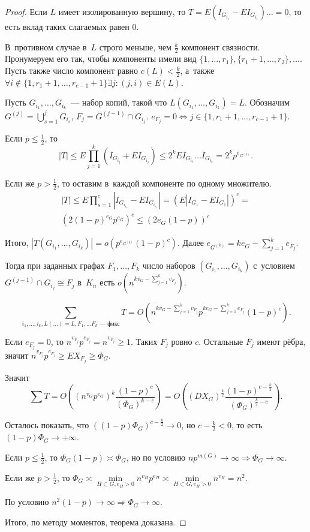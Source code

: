 \documentclass{article}
\begin{document}
\begin{proof}
	Если $L$ имеет изолированную вершину, то $T = E(I_{G_{i_1}} - EI_{G_{i_1}})
	\ldots = 0$, то есть вклад таких слагаемых равен 0.

	В~противном случае в~$L$ строго меньше, чем $\frac{k}{2}$ компонент связности.
	Пронумеруем его так, чтобы компоненты имели вид $\{1, \ldots, r_1\}, \{ r_1 +
	1, \ldots, r_2 \}, \ldots$. Пусть также число компонент равно $c(L) <
	\frac{k}{2}$, а~также $\forall i \notin \{1, r_1 + 1, \ldots, r_{c-1}+1\}
	\exists j: (j, i) \in E(L)$.

	Пусть $G_{i_1}, \ldots, G_{i_k}$~--- набор копий, такой что $L(G_{i_1},
	\ldots, G_{i_k}) = L$. Обозначим $G^{(j)} = \bigcup\limits_{s=1}^j G_{i_s}$,
	$F_j = G^{(j-1)} \cap G_{i_j}$. $e_{F_j} = 0 \Leftrightarrow j \in \{1, r_1 +
	1, \ldots, r_{c-1} + 1\}$.

	Если $p \le \frac{1}{2}$, то
	$$|T| \le E \prod\limits_{j=1}^k (I_{G_{i_j}} + EI_{G_{i_j}}) \le 2^k
	EI_{G_{i_1}} \ldots I_{G_{i_k}} = 2^k p^{e_{G^{(k)}}}.$$

	Если же $p > \frac{1}{2}$, то оставим в~каждой компоненте по одному множителю.
	\begin{multline*}
	|T| \le E \prod\limits_{s=1}^c |I_{G_{i_{r_s}}} - EI_{G_{i_{r_s}}}| =
	(E|I_{G_1} - EI_{G_1}|)^c =\\
		(2(1-p)^{e_G}p^{e_G})^c \le (2e_G(1-p))^c
	\end{multline*}

	Итого, $|T(G_{i_1}, \ldots, G_{i_k})| = o(p^{e_{G^{(k)}}} (1 - p)^c)$. Далее
	$e_{G^{(k)}} = k e_G - \sum\limits_{j=1}^k e_{F_j}$.

	Тогда при заданных графах $F_1, \ldots, F_k$ число наборов $(G_{i_1}, \ldots,
	G_{i_k})$ с~условием $G^{(j-1)} \cap G_{i_j} \cong F_j$ в~$K_n$ есть
	$o(n^{kv_G - \sum\limits_{j=1}^k v_{F_j}})$.

	$$\sum\limits_{i_1, \ldots, i_k, L(\ldots) = L, F_1, \ldots F_k \text{~---
	фикс}} T = O\left(n^{kv_G - \sum\limits_{j=1}^k v_{F_j}} p^{ke_G -
	\sum\limits_{j=1}^k e_{F_j}} (1-p)^c\right).$$

	Если $e_{F_j} = 0$, то $n^{v_{F_j}} p^{e_{F_j}} = n^{v_{F_j}} \ge 1$. Таких
	$F_j$ ровно $c$. Остальные $F_j$ имеют рёбра, значит $n^{v_{F_j}} p^{e_{F_j}}
	\ge E X_{F_j} \ge \Phi_G$.

	Значит
	$$\sum T = O\left((n^{v_G} p^{e_G})^k \frac{(1-p)^c}{(\Phi_G)^{k-c}}\right) =
	O\left((DX_G)^\frac{k}{2} \frac{(1-p)^{c-\frac{k}{2}}}{(\Phi_G)^{\frac{k}{2}
	- c}}\right).$$

	Осталось показать, что $((1-p)\Phi_G)^{c-\frac{k}{2}} \rightarrow 0$, но $c -
	\frac{k}{2} < 0$, то есть $(1 - p)\Phi_G \rightarrow +\infty$.

	Если $p \le \frac{1}{2}$, то $\Phi_G(1-p) \asymp \Phi_G$, но по условию
	$np^{m(G)} \rightarrow \infty \Rightarrow \Phi_G \rightarrow \infty$.

	Если же $p > \frac{1}{2}$, то $\Phi_G \asymp \min\limits_{H \subset G, e_H >
	0} n^{v_H} p^{e_H} \asymp \min\limits_{H \subset G, e_H > 0} n^{v_H} = n^2$.

	По условию $n^2(1-p) \rightarrow \infty \Rightarrow \Phi_G \rightarrow
	\infty$.

	Итого, по методу моментов, теорема доказана.
\end{proof}
\end{document}
